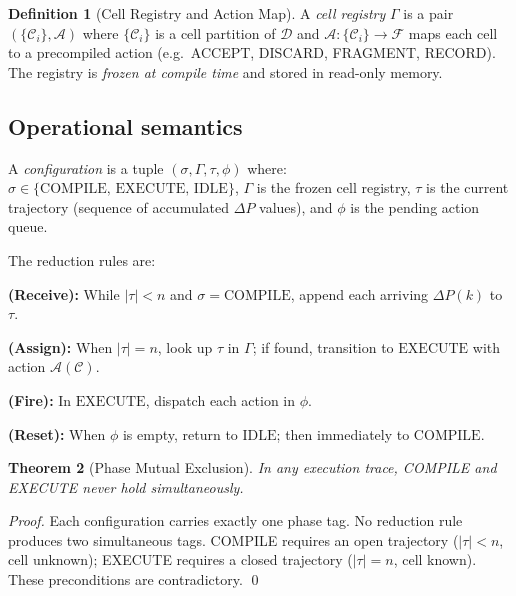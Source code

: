 \documentclass[twocolumn,10pt,a4paper]{article}
\theoremstyle{thmstyle}
\newtheorem{theorem}{Theorem}[section]
\theoremstyle{definition}
\newtheorem{definition}[theorem]{Definition}
\theoremstyle{remark}
\newcommand{\DP}{\Delta P}
\newcommand{\calC}{\mathcal{C}}
\newcommand{\calD}{\mathcal{D}}
\newcommand{\calA}{\mathcal{A}}
\begin{document}
\begin{definition}[Cell Registry and Action Map]
A \emph{cell registry} $\Gamma$ is a pair $(\{\calC_i\}, \calA)$ where
$\{\calC_i\}$ is a cell partition of $\calD$ and
$\calA: \{\calC_i\} \to \mathcal{F}$ maps each cell to a precompiled
action (e.g.\ ACCEPT, DISCARD, FRAGMENT, RECORD). The registry is
\emph{frozen at compile time} and stored in read-only memory.
\end{definition}

\subsection{Operational semantics}

A \emph{configuration} is a tuple $(\sigma, \Gamma, \tau, \phi)$ where:
$\sigma \in \{\mathrm{COMPILE},\, \mathrm{EXECUTE},\, \mathrm{IDLE}\}$,
$\Gamma$ is the frozen cell registry,
$\tau$ is the current trajectory (sequence of accumulated $\DP$ values),
and $\phi$ is the pending action queue.

The reduction rules are:

\vspace{4pt}
\noindent\textbf{(Receive):} While $|\tau| < n$ and $\sigma = \mathrm{COMPILE}$,
append each arriving $\DP(k)$ to $\tau$.

\noindent\textbf{(Assign):} When $|\tau| = n$, look up $\tau$ in $\Gamma$;
if found, transition to $\mathrm{EXECUTE}$ with action $\calA(\calC)$.

\noindent\textbf{(Fire):} In $\mathrm{EXECUTE}$, dispatch each action in $\phi$.

\noindent\textbf{(Reset):} When $\phi$ is empty, return to $\mathrm{IDLE}$;
then immediately to $\mathrm{COMPILE}$.
\vspace{4pt}

\begin{theorem}[Phase Mutual Exclusion]
\label{thm:phase}
In any execution trace, COMPILE and EXECUTE never hold simultaneously.
\end{theorem}

\begin{proof}
Each configuration carries exactly one phase tag. No reduction rule
produces two simultaneous tags. COMPILE requires an open trajectory
($|\tau| < n$, cell unknown); EXECUTE requires a closed trajectory
($|\tau| = n$, cell known). These preconditions are contradictory. \qed
\end{proof}

\end{document}
